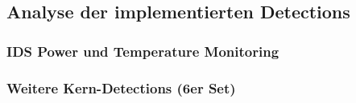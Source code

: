 \subsection{Analyse der implementierten Detections}
        \subsubsection{IDS Power und Temperature Monitoring}
        \subsubsection{Weitere Kern-Detections (6er Set)}
